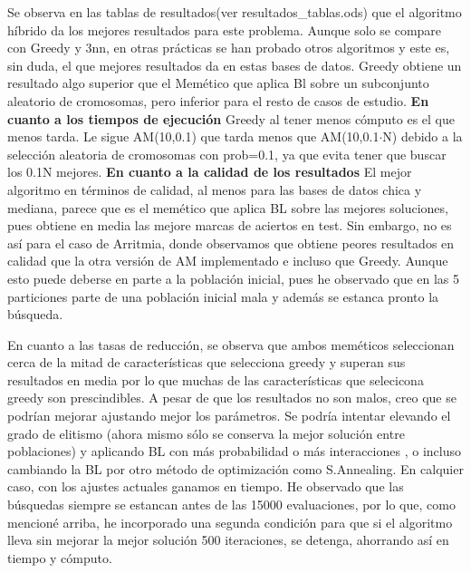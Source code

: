 \documentclass[	DIV=calc,%
							paper=a4,%
							fontsize=11pt,
							onecolumn]{scrartcl}	 					%
\begin{document}
Se observa en las tablas de resultados(ver resultados\_tablas.ods) que el algoritmo híbrido da los mejores resultados para este problema. Aunque solo se compare con Greedy y 3nn, en otras prácticas se han probado otros algoritmos y este es, sin duda, el que mejores resultados da en estas bases de datos. \newline
\newline
Greedy obtiene un resultado algo superior que el Memético que aplica Bl sobre un subconjunto  aleatorio de cromosomas, pero inferior para el resto de casos de estudio.\newline
\textbf{En cuanto a los tiempos de ejecución} Greedy al tener menos cómputo es el que menos tarda. Le sigue AM(10,0.1) que tarda menos que AM(10,0.1$\cdot$N) debido a la selección aleatoria de cromosomas con prob=0.1, ya que evita tener que buscar los 0.1N mejores.
\newline
\newline
\textbf{En cuanto a la calidad de los resultados} 
El mejor algoritmo en términos de calidad, al menos para las bases de datos chica y mediana, parece que es el memético que aplica BL sobre las mejores soluciones, pues obtiene en media las mejore marcas de aciertos en test. Sin embargo, no es así para el caso de Arritmia, donde observamos que obtiene peores resultados en calidad que la otra versión de AM implementado e incluso que Greedy. Aunque esto puede deberse en parte a la población inicial, pues he observado que en las 5 particiones parte de una población inicial mala y además se estanca pronto la búsqueda. \newline

En cuanto a las tasas de reducción, se observa que ambos meméticos seleccionan cerca de la mitad de características que selecciona greedy y superan sus resultados en media por lo que muchas de las características que selecicona greedy son prescindibles.\newline
\newline
A pesar de que los resultados no son malos, creo que se podrían mejorar ajustando mejor los parámetros. Se podría intentar elevando el grado de elitismo (ahora mismo sólo se conserva la mejor solución entre poblaciones) y aplicando BL con más probabilidad o más interacciones , o incluso cambiando la BL por otro método de optimización como S.Annealing. En calquier caso, con los ajustes actuales ganamos en tiempo. \newline
He observado que las búsquedas siempre se estancan antes de las 15000 evaluaciones, por lo que, como mencioné arriba, he incorporado una segunda condición para que si el algoritmo lleva sin mejorar la mejor solución 500 iteraciones, se detenga, ahorrando así en tiempo y cómputo. 
\end{document}
